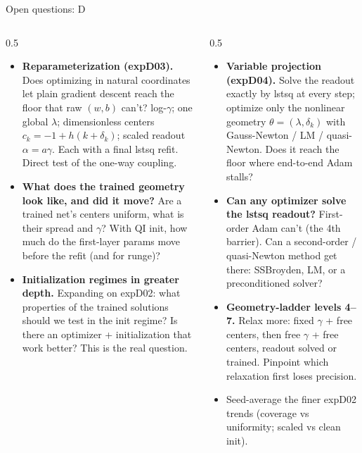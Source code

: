 \documentclass[aspectratio=169,10pt]{beamer}
\begin{document}
\begin{frame}{Open questions: D}
  \begin{columns}[T]
    \begin{column}{0.5\textwidth}
      \begin{itemize}\footnotesize
        \item \textbf{Reparameterization (expD03).} Does optimizing in natural
              coordinates let plain gradient descent reach the floor that raw
              $(w,b)$ can't? log-$\gamma$; one global $\lambda$; dimensionless
              centers $c_k=-1+h(k+\delta_k)$; scaled readout $\alpha=a\gamma$.
              Each with a final lstsq refit. Direct test of the one-way coupling.
        \item \textbf{What does the trained geometry look like, and did it
              move?} Are a trained net's centers uniform, what is their spread
              and $\gamma$? With QI init, how much do the first-layer params move
              before the refit (and for runge)?
        \item \textbf{Initialization regimes in greater depth.} Expanding on
              expD02: what properties of the trained solutions should we test in
              the init regime? Is there an optimizer + initialization that work
              better? This is the real question.
      \end{itemize}
    \end{column}
    \begin{column}{0.5\textwidth}
      \begin{itemize}\footnotesize
        \item \textbf{Variable projection (expD04).} Solve the readout exactly by
              lstsq at every step; optimize only the nonlinear geometry
              $\theta=(\lambda,\delta_k)$ with Gauss-Newton / LM / quasi-Newton.
              Does it reach the floor where end-to-end Adam stalls?
        \item \textbf{Can any optimizer solve the lstsq readout?} First-order
              Adam can't (the 4th barrier). Can a second-order / quasi-Newton
              method get there: SSBroyden, LM, or a preconditioned solver?
        \item \textbf{Geometry-ladder levels 4--7.} Relax more: fixed $\gamma$ +
              free centers, then free $\gamma$ + free centers, readout solved or
              trained. Pinpoint which relaxation first loses precision.
        \item Seed-average the finer expD02 trends (coverage vs uniformity;
              scaled vs clean init).
      \end{itemize}
    \end{column}
  \end{columns}
\end{frame}
\end{document}
